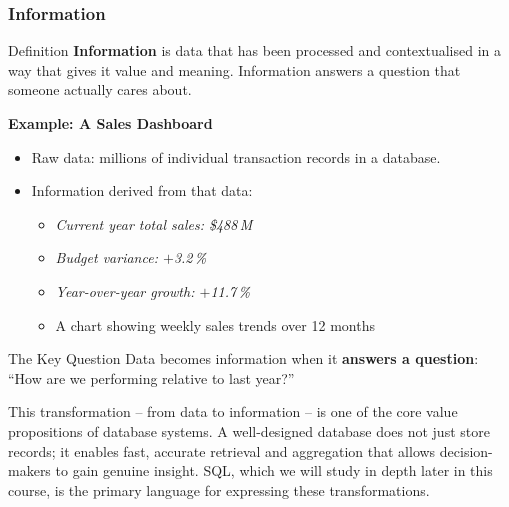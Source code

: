\begin{frame}
  \frametitle{Information}

  \begin{block}{Definition}
    \textbf{Information} is data that has been processed and contextualised in a way that gives it value and meaning. Information answers a question that someone actually cares about.
  \end{block}

  \vspace{0.5em}
  \textbf{Example: A Sales Dashboard}
  \begin{itemize}
    \item Raw data: millions of individual transaction records in a database.
    \item Information derived from that data:
    \begin{itemize}
      \item \textit{Current year total sales: \$488\,M}
      \item \textit{Budget variance: $+$3.2\,\%}
      \item \textit{Year-over-year growth: $+$11.7\,\%}
      \item A chart showing weekly sales trends over 12 months
    \end{itemize}
  \end{itemize}

  \vspace{0.5em}
  \begin{examples}{The Key Question}
    Data becomes information when it \textbf{answers a question}:\\
    ``How are we performing relative to last year?''
  \end{examples}

  This transformation -- from data to information -- is one of the core value propositions of database systems. A well-designed database does not just store records; it enables fast, accurate retrieval and aggregation that allows decision-makers to gain genuine insight. SQL, which we will study in depth later in this course, is the primary language for expressing these transformations.
\end{frame}

